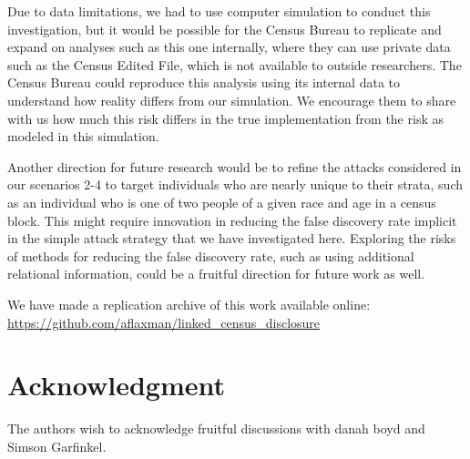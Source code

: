 \documentclass{jpc} %
\theoremstyle{plain}\newtheorem{satz}[thm]{Satz} %
\begin{document}
Due to data limitations, we had to use computer simulation to conduct this investigation, but it would be possible for the Census Bureau to replicate and expand on analyses such as this one internally, where they can use private data such as the Census Edited File, which is not available to outside researchers.  The Census Bureau could reproduce this analysis using its internal data to understand how reality differs from our simulation. We encourage them to share with us how much this risk differs in the true implementation from the risk as modeled in this simulation.

Another direction for future research would be to refine the attacks considered in our scenarios 2-4 to target individuals who are nearly unique to their strata, such as an individual who is one of two people of a given race and age in a census block.  This might require innovation in reducing the false discovery rate implicit in the simple attack strategy that we have investigated here.  Exploring the risks of methods for reducing the false discovery rate, such as using additional relational information, could be a fruitful direction for future work as well.

We have made a replication archive of this work available online: \url{https://github.com/aflaxman/linked_census_disclosure}%

\section*{Acknowledgment}
  \noindent The authors wish to acknowledge fruitful discussions with danah boyd and Simson Garfinkel.%




\end{document}
